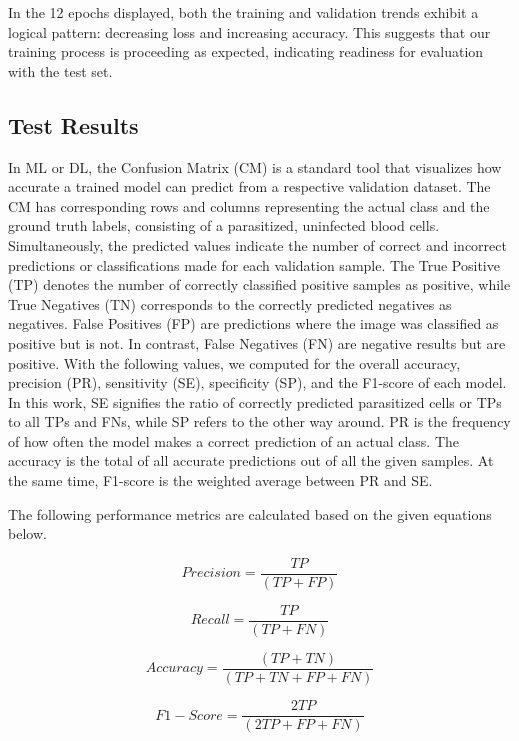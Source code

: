 \documentclass[12pt]{article}
\begin{document}
In the 12 epochs displayed, both the training and validation trends exhibit a logical pattern: decreasing loss and increasing accuracy. This suggests that our training process is proceeding as expected, indicating readiness for evaluation with the test set.

	\subsection{Test Results}
	In ML or DL, the Confusion Matrix (CM) is a standard tool that visualizes how accurate a
trained model can predict from a respective validation dataset. The CM has corresponding
rows and columns representing the actual class and the ground truth labels, consisting of a
parasitized, uninfected blood cells. Simultaneously, the predicted values indicate the number
of correct and incorrect predictions or classifications made for each validation sample. The
True Positive (TP) denotes the number of correctly classified positive samples as positive,
while True Negatives (TN) corresponds to the correctly predicted negatives as negatives. False
Positives (FP) are predictions where the image was classified as positive but is not. In contrast,
False Negatives (FN) are negative results but are positive.
With the following values, we computed for the overall accuracy, precision (PR),
sensitivity (SE), specificity (SP), and the F1-score of each model. In this work, SE signifies
the ratio of correctly predicted parasitized cells or TPs to all TPs and FNs, while SP refers to
the other way around. PR is the frequency of how often the model makes a correct prediction
of an actual class. The accuracy is the total of all accurate predictions out of all the given
samples. At the same time, F1-score is the weighted average between PR and SE.

The following performance metrics are calculated based on the given equations below.
\\
\begin{center}
\begin{equation}
Precision = \frac{TP}{(TP + FP) }
\end{equation} 

 \begin{equation}
Recall = \frac{TP}{(TP + FN) }
\end{equation} 

\begin{equation}
Accuracy = \frac{(TP + TN)}{(TP+ TN + FP + FN)  }
\end{equation} 


\begin{equation}
F1-Score = \frac{ 2TP}{(2TP + FP + FN) }
\end{equation} 
\end{center}
	
\end{document}
